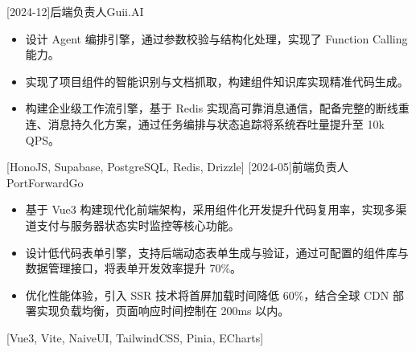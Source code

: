 \documentclass[zh]{resume}
\begin{document}
\begin{projects}
  [2024-12]{后端负责人}{}{Guii.AI}{
    \begin{itemize}
      \item 设计 Agent 编排引擎，通过参数校验与结构化处理，实现了 Function Calling 能力。
      \item 实现了项目组件的智能识别与文档抓取，构建组件知识库实现精准代码生成。
      \item 构建企业级工作流引擎，基于 Redis 实现高可靠消息通信，配备完整的断线重连、消息持久化方案，通过任务编排与状态追踪将系统吞吐量提升至 10k QPS。
    \end{itemize}
  }[HonoJS, Supabase, PostgreSQL, Redis, Drizzle]
  \separator{0.5ex}
  [2024-05]{前端负责人}{}{PortForwardGo}{
    \begin{itemize}
      \item 基于 Vue3 构建现代化前端架构，采用组件化开发提升代码复用率，实现多渠道支付与服务器状态实时监控等核心功能。
      \item 设计低代码表单引擎，支持后端动态表单生成与验证，通过可配置的组件库与数据管理接口，将表单开发效率提升 70\%。
      \item 优化性能体验，引入 SSR 技术将首屏加载时间降低 60\%，结合全球 CDN 部署实现负载均衡，页面响应时间控制在 200ms 以内。
    \end{itemize}
  }[Vue3, Vite, NaiveUI, TailwindCSS, Pinia, ECharts]
\end{projects}
\end{document}
